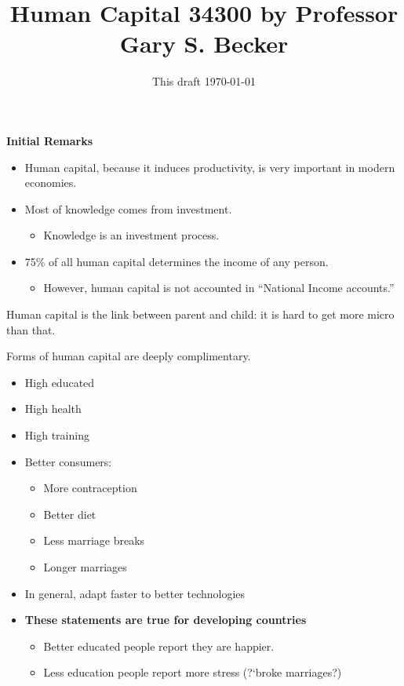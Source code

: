 \documentclass[14pt,notitlepage]{article}
\begin{document}
\title{Human Capital 34300 by Professor Gary S. Becker}
\date{This draft \today}

\maketitle

\large

\textbf{Initial Remarks}

\begin{itemize}
\item Human capital, because it induces productivity, is very important in modern economies.
\item Most of knowledge comes from investment.
	\begin{itemize}
	\item Knowledge is an investment process.
	\end{itemize}
\item 75\% of all human capital determines the income of any person.
	\begin{itemize}
	\item However, human capital is not accounted in ``National Income accounts.''
	\end{itemize}
\end{itemize}

\noindent Human capital is the link between parent and child: it is hard to get more micro than that.

\noindent Forms of human capital are deeply complimentary.

\begin{itemize}
\item High educated
\item High health
\item High training
\item Better consumers:
	\begin{itemize}
	\item More contraception
	\item Better diet
	\item Less marriage breaks
	\item Longer marriages
	\end{itemize}
\item In general, adapt faster to better technologies
\end{itemize}

\begin{itemize}
\item \textbf{These statements are true for developing countries}
	\begin{itemize}
	\item Better educated people report they are happier.
	\item Less education people report more stress (?`broke marriages?)
	\end{itemize}
\end{itemize}
\end{document}
